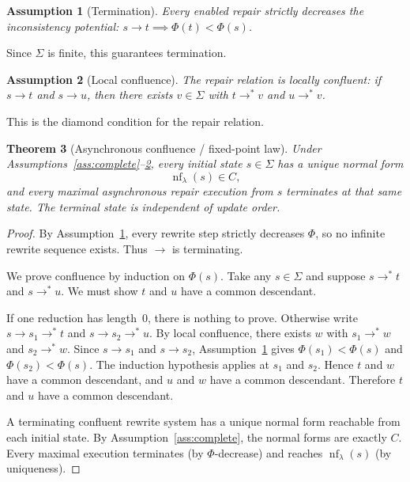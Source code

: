 \documentclass[11pt]{article}
\newtheorem{theorem}{Theorem}[section]
\newtheorem{assumption}[theorem]{Assumption}
\theoremstyle{remark}
\theoremstyle{plain}
\begin{document}
\begin{assumption}[Termination]\label{ass:termination}
Every enabled repair strictly decreases the inconsistency potential: $s\to t \implies \Phi(t)<\Phi(s)$.
\end{assumption}

Since $\Sigma$ is finite, this guarantees termination.

\begin{assumption}[Local confluence]\label{ass:confluence}
The repair relation is locally confluent: if $s\to t$ and $s\to u$, then there exists $v\in\Sigma$ with $t\to^* v$ and $u\to^* v$.
\end{assumption}

This is the diamond condition for the repair relation.

\begin{theorem}[Asynchronous confluence / fixed-point law]\label{thm:confluence}
Under Assumptions~\ref{ass:complete}--\ref{ass:confluence}, every initial state $s\in\Sigma$ has a unique normal form
\[
\operatorname{nf}_\lambda(s)\in C,
\]
and every maximal asynchronous repair execution from $s$ terminates at that same state. The terminal state is independent of update order.
\end{theorem}

\begin{proof}
By Assumption~\ref{ass:termination}, every rewrite step strictly decreases $\Phi$, so no infinite rewrite sequence exists. Thus $\to$ is terminating.

We prove confluence by induction on $\Phi(s)$. Take any $s\in\Sigma$ and suppose $s\to^* t$ and $s\to^* u$. We must show $t$ and $u$ have a common descendant.

If one reduction has length~0, there is nothing to prove. Otherwise write $s\to s_1\to^* t$ and $s\to s_2\to^* u$. By local confluence, there exists $w$ with $s_1\to^* w$ and $s_2\to^* w$. Since $s\to s_1$ and $s\to s_2$, Assumption~\ref{ass:termination} gives $\Phi(s_1)<\Phi(s)$ and $\Phi(s_2)<\Phi(s)$. The induction hypothesis applies at $s_1$ and $s_2$. Hence $t$ and $w$ have a common descendant, and $u$ and $w$ have a common descendant. Therefore $t$ and $u$ have a common descendant.

A terminating confluent rewrite system has a unique normal form reachable from each initial state. By Assumption~\ref{ass:complete}, the normal forms are exactly $C$. Every maximal execution terminates (by $\Phi$-decrease) and reaches $\operatorname{nf}_\lambda(s)$ (by uniqueness).
\end{proof}
\end{document}
